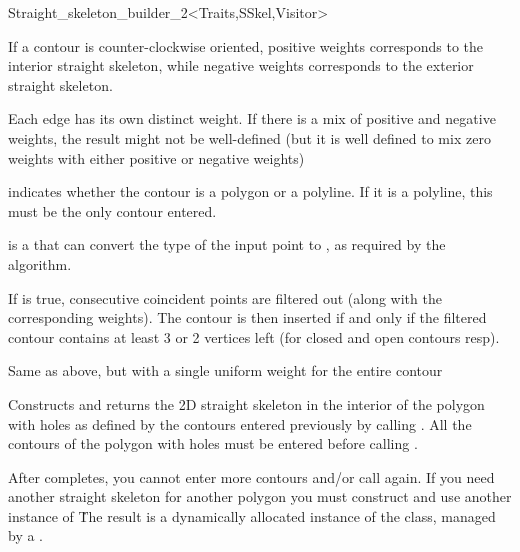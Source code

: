 \begin{ccRefClass}{Straight_skeleton_builder_2<Traits,SSkel,Visitor>}
{If a contour is counter-clockwise oriented, positive weights corresponds to the interior straight skeleton, while negative weights corresponds
to the exterior straight skeleton.

Each edge has its own distinct weight. If there is a mix of positive and negative weights, the result might not be well-defined (but it is well
defined to mix zero weights with either positive or negative weights)

 indicates whether the contour is a polygon or a polyline. If it is a polyline, this must be the only contour entered.

 is a  that can convert the type of the input point to , as required by the algorithm.

If  is true, consecutive coincident points are filtered out (along with the corresponding weights). The contour is then
inserted if and only if the filtered contour contains at least 3 or 2 vertices left (for closed and open contours resp).
}

\ccGlue
{}
{Same as above, but with a single uniform weight for the entire contour}

\ccGlue
{}
{Constructs and returns the 2D straight skeleton in the interior of the polygon with holes as defined by the contours
entered previously by calling . All the contours of the polygon with holes must be entered before
calling .

After  completes, you cannot enter more contours and/or call  again.
If you need another straight skeleton for another polygon you must construct and use another instance of \ccRefName\.

The result is a dynamically allocated instance of the  class, managed by a .

}
\end{ccRefClass}
